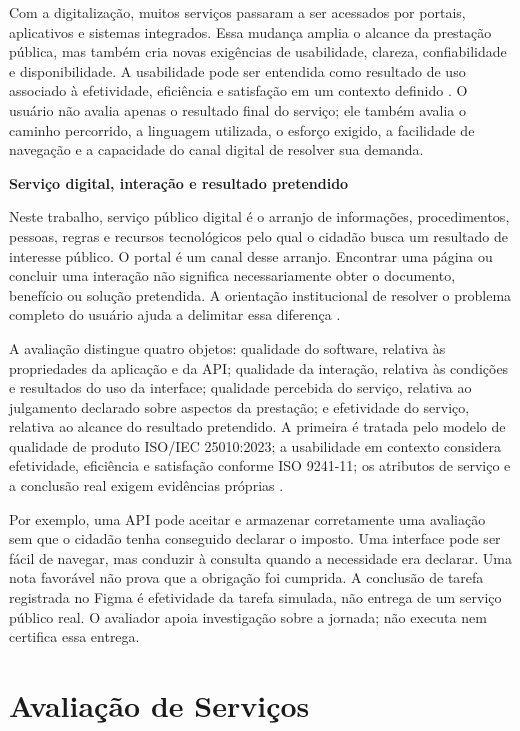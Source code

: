 Com a digitalização, muitos serviços passaram a ser acessados por portais, aplicativos e sistemas integrados. Essa mudança amplia o alcance da prestação pública, mas também cria novas exigências de usabilidade, clareza, confiabilidade e disponibilidade. A usabilidade pode ser entendida como resultado de uso associado à efetividade, eficiência e satisfação em um contexto definido \cite{iso2018}. O usuário não avalia apenas o resultado final do serviço; ele também avalia o caminho percorrido, a linguagem utilizada, o esforço exigido, a facilidade de navegação e a capacidade do canal digital de resolver sua demanda.

\textbf{Serviço digital, interação e resultado pretendido}

Neste trabalho, serviço público digital é o arranjo de informações, procedimentos, pessoas, regras e recursos tecnológicos pelo qual o cidadão busca um resultado de interesse público. O portal é um canal desse arranjo. Encontrar uma página ou concluir uma interação não significa necessariamente obter o documento, benefício ou solução pretendida. A orientação institucional de resolver o problema completo do usuário ajuda a delimitar essa diferença \cite{gds2026}.

A avaliação distingue quatro objetos: qualidade do software, relativa às propriedades da aplicação e da API; qualidade da interação, relativa às condições e resultados do uso da interface; qualidade percebida do serviço, relativa ao julgamento declarado sobre aspectos da prestação; e efetividade do serviço, relativa ao alcance do resultado pretendido. A primeira é tratada pelo modelo de qualidade de produto ISO/IEC 25010:2023; a usabilidade em contexto considera efetividade, eficiência e satisfação conforme ISO 9241-11; os atributos de serviço e a conclusão real exigem evidências próprias \cite{isoiec2023,iso2018}.

Por exemplo, uma API pode aceitar e armazenar corretamente uma avaliação sem que o cidadão tenha conseguido declarar o imposto. Uma interface pode ser fácil de navegar, mas conduzir à consulta quando a necessidade era declarar. Uma nota favorável não prova que a obrigação foi cumprida. A conclusão de tarefa registrada no Figma é efetividade da tarefa simulada, não entrega de um serviço público real. O avaliador apoia investigação sobre a jornada; não executa nem certifica essa entrega.

\section{Avaliação de Serviços}
\label{sec:2.2}

